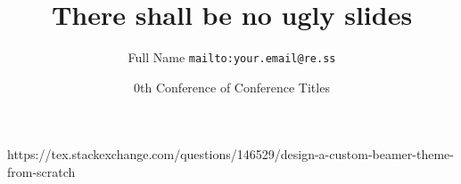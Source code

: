 \documentclass{beamer}
\title{There shall be no ugly slides}
\date[Conference '00]{0th Conference of Conference Titles}
\author[Shortname]{Full Name \texttt{mailto:your.email@re.ss}}
\begin{document}
https://tex.stackexchange.com/questions/146529/design-a-custom-beamer-theme-from-scratch
\begin{frame}
\titlepage

\end{frame}
\end{document}
